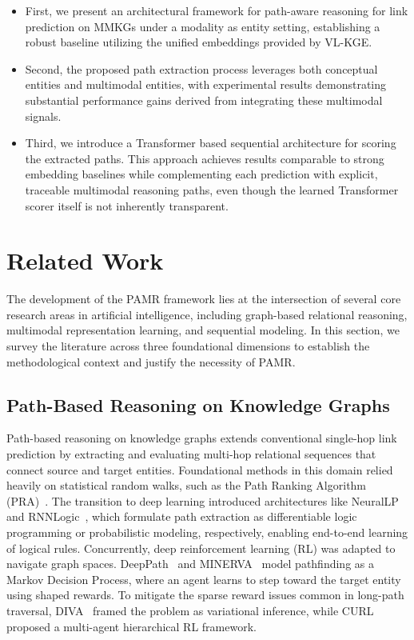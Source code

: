\documentclass[runningheads]{llncs}
\begin{document}
\begin{itemize}
  \item First, we present an architectural framework for path-aware reasoning for link prediction on MMKGs under a modality as entity setting, establishing a robust baseline utilizing the unified embeddings provided by VL-KGE.
  \item Second, the proposed path extraction process leverages both conceptual entities and multimodal entities, with experimental results demonstrating substantial performance gains derived from integrating these multimodal signals.
  \item Third, we introduce a Transformer based sequential architecture for scoring the extracted paths. This approach achieves results comparable to strong embedding baselines while complementing each prediction with explicit, traceable multimodal reasoning paths, even though the learned Transformer scorer itself is not inherently transparent.
\end{itemize}

\section{Related Work}
\label{sec:related-work}

The development of the PAMR framework lies at the intersection of several core research areas in artificial intelligence, including graph-based relational reasoning, multimodal representation learning, and sequential modeling. In this section, we survey the literature across three foundational dimensions to establish the methodological context and justify the necessity of PAMR.

\subsection{Path-Based Reasoning on Knowledge Graphs}
\label{sec:rw-path-reasoning}

Path-based reasoning on knowledge graphs extends conventional single-hop link prediction by extracting and evaluating multi-hop relational sequences that connect source and target entities. Foundational methods in this domain relied heavily on statistical random walks, such as the Path Ranking Algorithm (PRA)~\cite{lao2011random}. The transition to deep learning introduced architectures like NeuralLP~\cite{yang2017differentiable} and RNNLogic~\cite{qu2021rnnlogic}, which formulate path extraction as differentiable logic programming or probabilistic modeling, respectively, enabling end-to-end learning of logical rules. Concurrently, deep reinforcement learning (RL) was adapted to navigate graph spaces. DeepPath~\cite{xiong2017deeppath} and MINERVA~\cite{das2018go} model pathfinding as a Markov Decision Process, where an agent learns to step toward the target entity using shaped rewards. To mitigate the sparse reward issues common in long-path traversal, DIVA~\cite{chen2018variational} framed the problem as variational inference, while CURL~\cite{zhang2022learning} proposed a multi-agent hierarchical RL framework.
\end{document}
